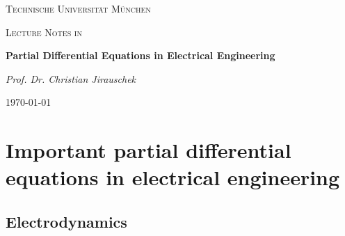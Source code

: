 \documentclass[11pt,a4paper]{report}
\begin{document}
\begin{titlepage}
	\centering
	{\scshape\LARGE Technische Universit\"at M\"unchen\par}
	\vspace{1cm}
	{\scshape\Large Lecture Notes in\par}
	\vspace{1.5cm}
	{\huge\bfseries Partial Differential Equations in Electrical Engineering \par}
	\vspace{2cm}
	{\Large\itshape Prof. Dr. Christian Jirauschek \par}
	\vfill
	{\large \today\par}
\end{titlepage}
\tableofcontents{}

\chapter{Important partial differential equations in electrical engineering} 
\section{Electrodynamics}
\end{document}
